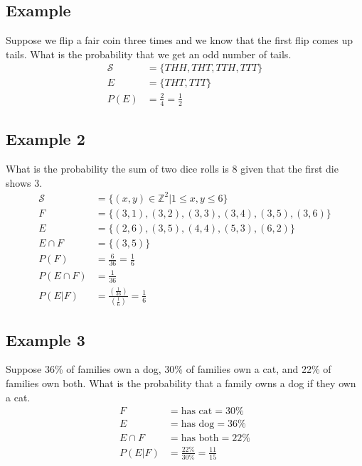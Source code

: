 \documentclass{article}
\theoremstyle{mytheoremstyle}
\theoremstyle{mytheoremstyle}
\theoremstyle{myproblemstyle}
\begin{document}
    \subsection*{Example}
    Suppose we flip a fair coin three times and we know that the first flip
    comes up tails. What is the probability that we get an odd number of tails.
    \begin{align*}
        \mathcal{S} &= \{THH, THT, TTH, TTT\} \\
        E &= \{THT, TTT\} \\
        P(E) &= \frac{2}{4} = \frac{1}{2}
    \end{align*}

    \subsection*{Example 2}
    What is the probability the sum of two dice rolls is 8 given that the first
    die shows 3.
    \begin{align*}
        \mathcal{S} &= \{(x,y) \in \mathbb{Z}^2 | 1 \le x,y \le 6 \} \\
        F &= \{ (3, 1), (3, 2), (3, 3), (3, 4), (3, 5), (3,6) \} \\
        E &= \{ (2, 6), (3, 5), (4, 4), (5, 3), (6, 2) \} \\
        E \cap F &= \{(3, 5)\} \\
        P(F) &= \frac{6}{36} = \frac{1}{6} \\
        P(E \cap F) &= \frac{1}{36} \\
        P(E | F) &= \frac{(\frac{1}{36})}{(\frac{1}{6})} = \frac{1}{6}
    \end{align*}

    \subsection*{Example 3}
    Suppose 36\% of families own a dog, 30\% of families own a cat, and 22\% of
    families own both. What is the probability that a family owns a dog if they
    own a cat.
    \begin{align*}
        F &= \text{has cat} = 30\% \\
        E &= \text{has dog} = 36\% \\
        E \cap F &= \text{has both} = 22\% \\
        P(E | F) &= \frac{22\%}{30\%} = \frac{11}{15}
    \end{align*}
\end{document}
